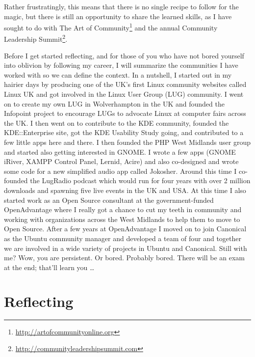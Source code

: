Rather frustratingly, this means that there is no single recipe to follow for the magic, but there is still an opportunity to share the learned skills, as I have sought to do with The Art of Community\footnote{\url{http://artofcommunityonline.org}} and the annual Community Leadership Summit\footnote{\url{http://communityleadershipsummit.com}}.

Before I get started reflecting, and for those of you who have not bored yourself into oblivion by following my career, I will summarize the communities I have worked with so we can define the context. In a nutshell, I started out in my hairier days by producing one of the UK’s first Linux community websites called Linux UK and got involved in the Linux User Group (LUG) community. I went on to create my own LUG in Wolverhampton in the UK and founded the Infopoint project to encourage LUGs to advocate Linux at computer fairs across the UK. I then went on to contribute to the KDE community, founded the KDE::Enterprise site, got the KDE Usability Study going, and contributed to a few little apps here and there. I then founded the PHP West Midlands user group and started also getting interested in GNOME. I wrote a few apps (GNOME iRiver, XAMPP Control Panel, Lernid, Acire) and also co-designed and wrote some code for a new simplified audio app called Jokosher. Around this time I co-founded the LugRadio podcast which would run for four years with over 2 million downloads and spawning five live events in the UK and USA. At this time I also started work as an Open Source consultant at the government-funded OpenAdvantage where I really got a chance to cut my teeth in community and working with organizations across the West Midlands to help them to move to Open Source. After a few years at OpenAdvantage I moved on to join Canonical as the Ubuntu community manager and developed a team of four and together we are involved in a wide variety of projects in Ubuntu and Canonical.
\newline
Still with me?
\newline
Wow, you are persistent. Or bored. Probably bored. There will be an exam at the end; that’ll learn you \dots

\section*{Reflecting}

